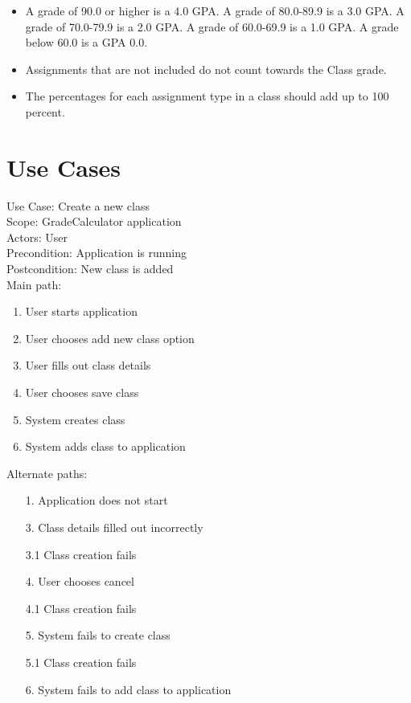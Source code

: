 \documentclass[12pt]{article}
\begin{document}
\begin{itemize}
	\item A grade of 90.0 or higher is a 4.0 GPA. A grade of 80.0-89.9 is a 3.0 GPA. A grade of 70.0-79.9 is a 2.0 GPA. A grade of 60.0-69.9 is a 1.0 GPA. A grade below 60.0 is a GPA 0.0.
	\item Assignments that are not included do not count towards the Class grade.
	\item The percentages for each assignment type in a class should add up to 100 percent.
\end{itemize}

\newpage

\section*{Use Cases}

\noindent
Use Case: Create a new class \\

\noindent
Scope: GradeCalculator application \\

\noindent
Actors: User \\

\noindent
Precondition: Application is running \\

\noindent
Postcondition: New class is added \\

\noindent
Main path:

\begin{enumerate}
	\item User starts application
	\item User chooses add new class option
	\item User fills out class details
	\item User chooses save class
	\item System creates class
	\item System adds class to application
\end{enumerate}

\noindent
Alternate paths:
\begin{enumerate}
	\item[1.] Application does not start
	\item[3.] Class details filled out incorrectly
	\item[3.1] Class creation fails
	\item[4.] User chooses cancel
	\item[4.1] Class creation fails 
	\item[5.] System fails to create class
	\item[5.1] Class creation fails
	\item[6.] System fails to add class to application
\end{enumerate}
\end{document}
